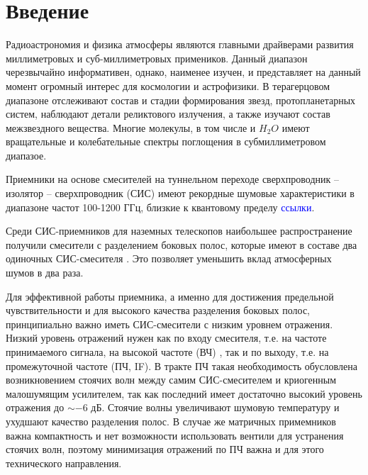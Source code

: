 \documentclass[a4paper]{article}
\begin{document}
\section{Введение}

Радиоастрономия и физика атмосферы являются главными драйверами развития миллиметровых и суб-миллиметровых примеников. Данный диапазон черезвычайно информативен, однако, наименее изучен, и представляет на данный момент огромный интерес для космологии и астрофизики. В терагерцовом диапазоне отслеживают состав и стадии формирования звезд, протопланетарных систем, наблюдают детали реликтового излучения, а также изучают состав межзвездного вещества. Многие молекулы, в том числе и $H_{2}O$ имеют вращательные и колебательные спектры поглощения в субмиллиметровом диапазое.
\par

Приемники на основе смесителей на туннельном переходе сверхпроводник – изолятор – сверхпроводник (СИС) \cite{Tucker} 
имеют рекордные шумовые характеристики в диапазоне частот 100-1200 ГГц, близкие к квантовому пределу \textcolor{blue}{ссылки}.
\par

Среди СИС-приемников для наземных телескопов наибольшее распространение получили 
смесители с разделением боковых полос, которые имеют в составе два одиночных СИС-смесителя \cite{Belitsky} \cite{Chenu}. Это позволяет уменьшить вклад атмосферных шумов в два раза.

\par

Для эффективной работы 
приемника, а именно для достижения предельной чувствительности и для высокого качества разделения боковых полос, принципиально важно иметь СИС-смесители 
с низким уровнем отражения. Низкий уровень отражений нужен как по входу смесителя, т.е. на частоте принимаемого сигнала, на высокой частоте (ВЧ) 
\cite{Hesper} \cite{Khudchenko}, так и по выходу, т.е. на промежуточной частоте (ПЧ, IF). В тракте ПЧ такая необходимость обусловлена возникновением 
стоячих волн между самим СИС-смесителем и криогенным малошумящим усилителем, так как последний имеет достаточно высокий уровень отражения до $\sim -6$ дБ.
Стоячие волны увеличивают шумовую температуру и ухудшают качество разделения полос. В случае же матричных примемников важна компактность и нет возможности использовать вентили для устранения стоячих волн, поэтому минимизация отражений по ПЧ важна и для этого технического направления.
\par
\end{document}

